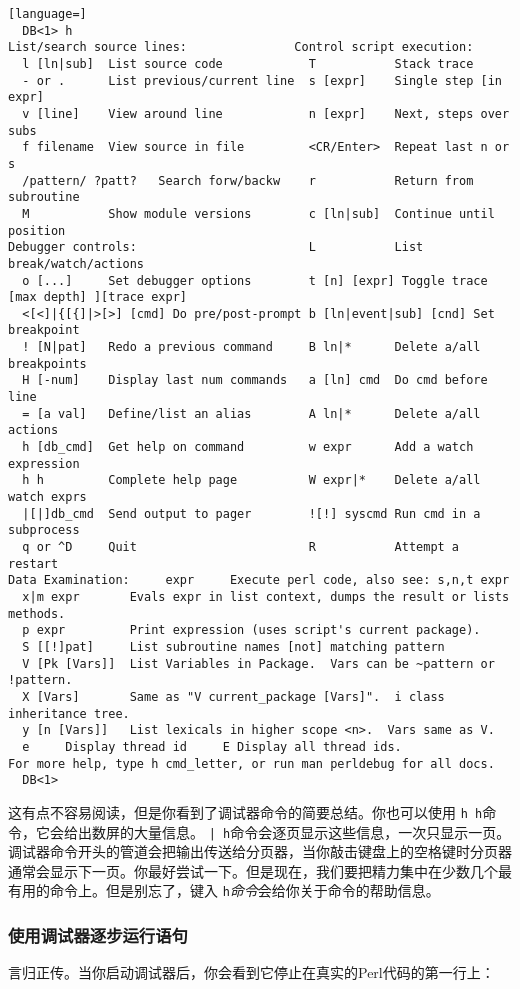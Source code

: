 \begin{lstlisting}[language=]
  DB<1> h
List/search source lines:               Control script execution:
  l [ln|sub]  List source code            T           Stack trace
  - or .      List previous/current line  s [expr]    Single step [in expr]
  v [line]    View around line            n [expr]    Next, steps over subs
  f filename  View source in file         <CR/Enter>  Repeat last n or s
  /pattern/ ?patt?   Search forw/backw    r           Return from subroutine
  M           Show module versions        c [ln|sub]  Continue until position
Debugger controls:                        L           List break/watch/actions
  o [...]     Set debugger options        t [n] [expr] Toggle trace [max depth] ][trace expr]
  <[<]|{[{]|>[>] [cmd] Do pre/post-prompt b [ln|event|sub] [cnd] Set breakpoint
  ! [N|pat]   Redo a previous command     B ln|*      Delete a/all breakpoints
  H [-num]    Display last num commands   a [ln] cmd  Do cmd before line
  = [a val]   Define/list an alias        A ln|*      Delete a/all actions
  h [db_cmd]  Get help on command         w expr      Add a watch expression
  h h         Complete help page          W expr|*    Delete a/all watch exprs
  |[|]db_cmd  Send output to pager        ![!] syscmd Run cmd in a subprocess
  q or ^D     Quit                        R           Attempt a restart
Data Examination:     expr     Execute perl code, also see: s,n,t expr
  x|m expr       Evals expr in list context, dumps the result or lists methods.
  p expr         Print expression (uses script's current package).
  S [[!]pat]     List subroutine names [not] matching pattern
  V [Pk [Vars]]  List Variables in Package.  Vars can be ~pattern or !pattern.
  X [Vars]       Same as "V current_package [Vars]".  i class inheritance tree.
  y [n [Vars]]   List lexicals in higher scope <n>.  Vars same as V.
  e     Display thread id     E Display all thread ids.
For more help, type h cmd_letter, or run man perldebug for all docs.
  DB<1> 
\end{lstlisting}

这有点不容易阅读，但是你看到了调试器命令的简要总结。你也可以使用 \verb|h h|命令，它会给出数屏的大量信息。 \verb=| h=命令会逐页显示这些信息，一次只显示一页。调试器命令开头的管道会把输出传送给分页器，当你敲击键盘上的空格键时分页器通常会显示下一页。你最好尝试一下。但是现在，我们要把精力集中在少数几个最有用的命令上。但是别忘了，键入 \verb|h|\textit{命令}会给你关于命令的帮助信息。

\subsubsection{使用调试器逐步运行语句}
言归正传。当你启动调试器后，你会看到它停止在真实的Perl代码的第一行上：


